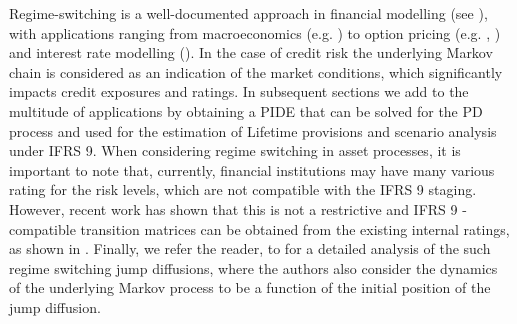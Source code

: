 \documentclass[11pt,reqno]{article}
\theoremstyle{definition}
\begin{document}
\par Regime-switching is a well-documented approach in financial modelling (see \cite{hamilton2010regime}), with applications ranging from macroeconomics (e.g. \cite{aristidou2018meta}) to option pricing (e.g. \cite{duan2002option}, \cite{hainaut2014intensity}) and interest rate modelling (\cite{goutte2011conditional}). In the case of credit risk the underlying Markov chain is considered as an indication of the market conditions, which significantly impacts credit exposures and ratings. In subsequent sections we add to the multitude of applications by obtaining a PIDE that can be solved for the PD process and used for the estimation of Lifetime provisions and scenario analysis under IFRS 9. When considering regime switching in asset processes, it is important to note that, currently, financial institutions may have many various rating for the risk levels, which are not compatible with the IFRS 9 staging. However, recent work has shown that this is not a restrictive and IFRS 9 - compatible transition matrices can be obtained from the existing internal ratings, as shown in \cite{georgiou2021markov}. Finally, we refer the reader, to \cite{zhu2015feynman} for a detailed analysis of the such regime switching jump diffusions, where the authors also consider the dynamics of the underlying Markov process to be a function of the initial position of the jump diffusion.

\end{document}
